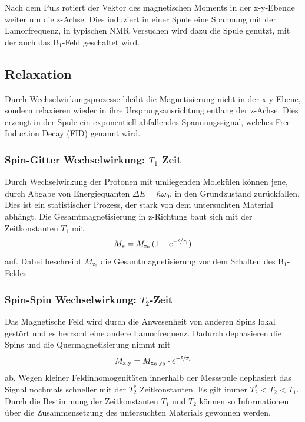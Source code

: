 Nach dem Puls rotiert der Vektor des magnetischen Moments in der x-y-Ebende weiter um die z-Achse.
Dies induziert in einer Spule eine Spannung mit der Lamorfrequenz, in typischen NMR Versuchen wird dazu die Spule genutzt, mit der auch das B$_1$-Feld geschaltet wird.


\subsection{Relaxation}
Durch Wechselwirkungsprozesse bleibt die Magnetisierung nicht in der x-y-Ebene, sondern relaxieren wieder in ihre Ursprungsausrichtung entlang der z-Achse.
Dies erzeugt in der Spule ein exponentiell abfallendes Spannungssignal, welches Free Induction Decay (FID) genannt wird.


\subsubsection{Spin-Gitter Wechselwirkung: $T_1$ Zeit}

Durch Wechselwirkung der Protonen mit umliegenden Molekülen können jene, durch Abgabe von Energiequanten $\Delta E = \hbar \omega_0$, in den Grundzustand zurückfallen.
Dies ist ein statistischer Prozess, der stark von dem untersuchten Material abhängt.
Die Gesamtmagnetisierung in z-Richtung baut sich mit der Zeitkonstanten $T_1$ mit
\begin{equation}
  M_\text{z} = M_\text{z$_0$} \, (1-e^{-\sfrac{t}{T_1}})
  \label{eqn:T1Zeit}
\end{equation}
auf. Dabei beschreibt $M_\text{z$_0$}$ die Gesamtmagnetisierung vor dem Schalten des B$_1$-Feldes.


\subsubsection{Spin-Spin Wechselwirkung: $T_2$-Zeit}

Das Magnetische Feld wird durch die Anwesenheit von anderen Spins lokal gestört und es herrscht eine andere Lamorfrequenz.
Dadurch dephasieren die Spins und die Quermagnetisierung nimmt mit
\begin{equation}
  M_\text{x,y} = M_\text{x$_0$,y$_0$} \cdot e^{-\sfrac{t}{T_2}}
  \label{eqn:T2Zeit}
\end{equation}
ab.
Wegen kleiner Feldinhomogenitäten innerhalb der Messspule dephasiert das Signal nochmals schneller mit der $T_2^*$ Zeitkonstanten.
Es gilt immer $T_2^*<T_2<T_1$.
Durch die Bestimmung der Zeitkonstanten $T_1$ und $T_2$ können so Informationen über die Zusammensetzung des untersuchten Materials gewonnen werden.

